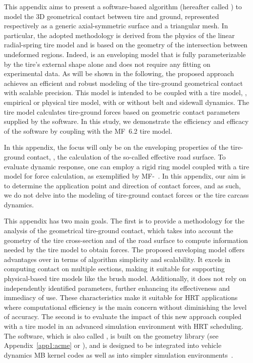 This appendix aims to present a software-based algorithm (hereafter called \Enve{}) to model the 3D geometrical contact between tire and ground, represented respectively as a generic axial-symmetric surface and a triangular mesh. In particular, the adopted methodology is derived from the physics of the linear radial-spring tire model and is based on the geometry of the intersection between undeformed regions. Indeed, \Enve{} is an enveloping model that is fully parameterizable by the tire's external shape alone and does not require any fitting on experimental data. As will be shown in the following, the proposed approach achieves an efficient and robust modeling of the tire-ground geometrical contact with scalable precision. This model is intended to be coupled with a tire model, \ie{}, empirical or physical tire model, with or without belt and sidewall dynamics. The tire model calculates tire-ground forces based on geometric contact parameters supplied by the \Enve{} software. In this study, we demonstrate the efficiency and efficacy of the software by coupling \Enve{} with the \ac{MF}~6.2 tire model.
%
\begin{remark}
  In this appendix, the focus will only be on the enveloping properties of the tire-ground contact, \ie{}, the calculation of the so-called effective road surface. To evaluate dynamic response, one can employ a rigid ring model coupled with a tire model for force calculation, as exemplified by \ac{MF}-\Swift{}~\cite{pacejka2012tire, schmeitz2004semiempirical}. In this appendix, our aim is to determine the application point and direction of contact forces, and as such, we do not delve into the modeling of tire-ground contact forces or the tire carcass dynamics.
\end{remark}
%
This appendix has two main goals. The first is to provide a methodology for the analysis of the geometrical tire-ground contact, which takes into account the geometry of the tire cross-section and of the road surface to compute information needed by the tire model to obtain forces. The proposed enveloping model offers advantages over \Swift{} in terms of algorithm simplicity and scalability. It excels in computing contact on multiple sections, making it suitable for supporting physical-based tire models like the brush model. Additionally, it does not rely on independently identified parameters, further enhancing its effectiveness and immediacy of use. These characteristics make it suitable for \ac{HRT} applications where computational efficiency is the main concern without diminishing the level of accuracy. The second is to evaluate the impact of this new approach coupled with a tire model in an advanced simulation environment with \ac{HRT} scheduling. The software, which is also called \Enve{}, is built on the \Acme{} geometry library (see Appendix~\ref{app1:acme} or \citet{stocco2021acme}), and is designed to be integrated into vehicle dynamics \ac{MB} kernel codes as well as into simpler simulation environments~\cite{piccinini2022predictive, piccinini2023physics}.

